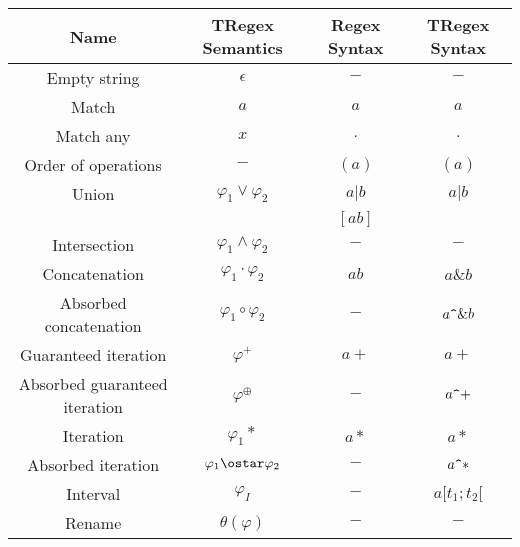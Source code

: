 \begin{tabular}{ |c|c|c|c| }
    \hline
    \textbf{Name} & \textbf{TRegex Semantics} & \textbf{Regex Syntax} & \textbf{TRegex Syntax} \\
    \hline
    Empty string & $\epsilon$ & $-$ & $-$ \\
    \hline
    Match & $a$ & $a$ & $a$ \\
    \hline
    Match any & $x$ & $.$ & $.$ \\
    \hline
    Order of operations & $-$ & $(a)$ & $(a)$ \\
    \hline
    Union & $\varphi_1\vee\varphi_2$ & $a|b$ & $a|b$ \\
    & & $[ab]$ &  \\
    \hline
    Intersection & $\varphi_1\wedge\varphi_2$ & $-$ & $-$ \\
    \hline
    Concatenation & $\varphi_1\cdot\varphi_2$ & $ab$ & $a\&b$ \\
    \hline
    Absorbed concatenation & $\varphi_1\circ\varphi_2$ & $-$ & $a\verb|^|\&b$ \\
    \hline
    Guaranteed iteration & $\varphi^+$ & $a+$ & $a+$ \\
    \hline
    Absorbed guaranteed iteration & $\varphi^\oplus$ & $-$ & $a\verb|^|+$ \\
    \hline
    Iteration & $\varphi_1*$ & $a*$ & $a*$ \\
    \hline
    Absorbed iteration & $\varphi_1\ostar\varphi_2$ & $-$ & $a\verb|^|*$ \\
    \hline
    Interval & $\varphi_I$ & $-$ & $a[t_1;t_2[$ \\
    \hline
    Rename & $\theta(\varphi)$ & $-$ & $-$ \\
    \hline
\end{tabular}